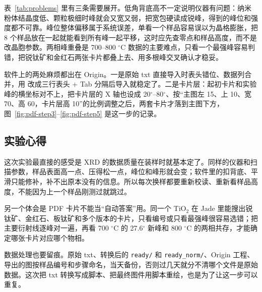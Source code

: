 表~\ref{tab:problems} 里有三条需要展开。低角背底高不一定说明仪器有问题：纳米粉体结晶度低、颗粒极细时峰就会又宽又弱，把宽包硬读成锐峰，得到的峰位和强度都不可靠。峰位整体偏移属于系统误差，单看一个样品容易误以为晶格膨胀，把 8 个样品放在一起就能看到所有峰一起平移，这时应先查零点和样品高度，而不是改晶胞参数。两相峰重叠是 700--800 $^\circ$C 数据的主要难点，只看一个最强峰容易判错，把锐钛矿和金红石两张卡片都叠上去、用多根峰交叉确认才稳妥。

软件上的两处麻烦都出在 Origin。一是原始 txt 直接导入时表头错位、数据列合并，用 \pyA 改成三行表头 + Tab 分隔后导入就稳定了。二是卡片层：起初卡片和实验峰的横坐标对不上，把卡片层的 X 轴也设成 20$^\circ$--80$^\circ$、按“主图左 15、上 10、宽 70、高 60，卡片层高 10”的比例调整之后，两套卡片才落到主图下方，图~\ref{fig:pdf-step3}--\ref{fig:pdf-step5} 是这一步的记录。

\subsection{实验心得}

这次实验最直接的感受是 XRD 的数据质量在装样时就基本定了。同样的仪器和扫描参数，样品表面高一点、压得松一点，峰位和峰形就会变；软件里的扣背底、平滑只能修补，补不出原本没有的信息。所以每次换样都要重新校读、重新看样品高度，不能因为上一个样品刚测过就跳过。

另一个体会是 PDF 卡片不能当“自动答案”用。同一个 TiO$_2$ 在 Jade 里能搜出锐钛矿、金红石、板钛矿和多个版本的卡片，只看编号或只看最强峰很容易选错；把主要衍射线逐峰对一遍，再看 700 $^\circ$C 的 27.6$^\circ$ 新峰和 800 $^\circ$C 的两相共存，才能确定哪张卡片对应哪个物相。

数据处理也要留痕。原始 txt、转换后的 \texttt{ready/} 和 \texttt{ready\_norm/}、Origin 工程、导出的图按样品编号和步骤命名，当天备份，否则过几天就分不清哪个文件是原始数据。这次把 txt 转换写成脚本、把最终图件用脚本重绘，也是为了让这一步可以重复。
